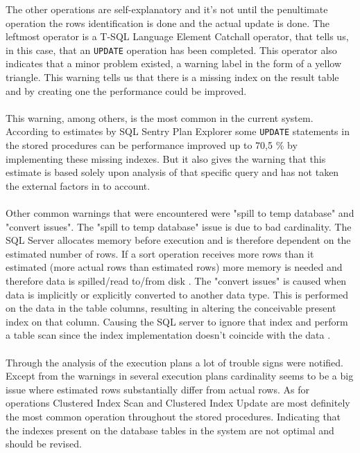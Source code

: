 \documentclass{cslthse-msc}
\begin{document}
The other operations are self-explanatory and it's not until the penultimate operation the rows identification is done and the actual update is done. The leftmost operator is a T-SQL Language Element Catchall operator, that tells us, in this case, that an \texttt{UPDATE} operation has been completed. This operator also indicates that a minor problem existed, a warning label in the form of a yellow triangle. This warning tells us that there is a missing index on the result table and by creating one the performance could be improved.\\\\
This warning, among others, is the most common in the current system. According to estimates by SQL Sentry Plan Explorer some \texttt{UPDATE} statements in the stored procedures can be performance improved up to 70,5 \% by implementing these missing indexes. But it also gives the warning that this estimate is based solely upon analysis of that specific query and has not taken the external factors in to account.\\\\ 
Other common warnings that were encountered were "spill to temp database" and "convert issues". The "spill to temp database" issue is due to bad cardinality. The SQL Server allocates memory before execution and is therefore dependent on the estimated number of rows. If a sort operation receives more rows than it estimated (more actual rows than estimated rows) more memory is needed and therefore data is spilled/read to/from disk \cite{sortissues}. The "convert issues" is caused when data is implicitly or explicitly converted to another data type. This is performed on the data in the table columns, resulting in altering the conceivable present index on that column. Causing the SQL server to ignore that index and perform a table scan since the index implementation doesn't coincide with the data \cite{convertissues}.\\\\
Through the analysis of the execution plans a lot of trouble signs were notified. Except from the warnings in several execution plans cardinality seems to be a big issue where estimated rows substantially differ from actual rows. As for operations Clustered Index Scan and Clustered Index Update are most definitely the most common operation throughout the stored procedures. Indicating that the indexes present on the database tables in the system are not optimal and should be revised.    

\newpage
\end{document}
